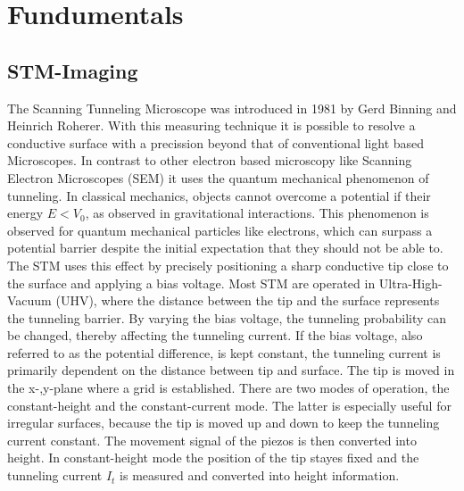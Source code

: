 \chapter{Fundumentals}
\label{sec:Fundumentals}
\section{STM-Imaging}
The Scanning Tunneling Microscope was introduced in 1981 by Gerd Binning and Heinrich Roherer. 
With this measuring technique it is possible to resolve a conductive surface with a precission beyond that of conventional light based Microscopes.
In contrast to other electron based microscopy like Scanning Electron Microscopes (SEM) it uses the quantum mechanical phenomenon of tunneling.
In classical mechanics, objects cannot overcome a potential if their energy $E < V_0$, as observed in gravitational interactions.
This phenomenon is observed for quantum mechanical particles like electrons, which can surpass a potential barrier despite the initial expectation that they should not be able to.
The STM uses this effect by precisely positioning a sharp conductive tip close to the surface and applying a bias voltage.
Most STM are operated in Ultra-High-Vacuum (UHV), where the distance between the tip and the surface represents the tunneling barrier.
By varying the bias voltage, the tunneling probability can be changed, thereby affecting the tunneling current.
If the bias voltage, also referred to as the potential difference, is kept constant, the tunneling current is primarily dependent on the distance between tip and surface.
The tip is moved in the x-,y-plane where a grid is established. 
There are two modes of operation, the constant-height and the constant-current mode.
The latter is especially useful for irregular surfaces, because the tip is moved up and down to keep the tunneling current constant.
The movement signal of the piezos is then converted into height.
In constant-height mode the position of the tip stayes fixed and the tunneling current $I_t$ is measured and converted into height information. \\

